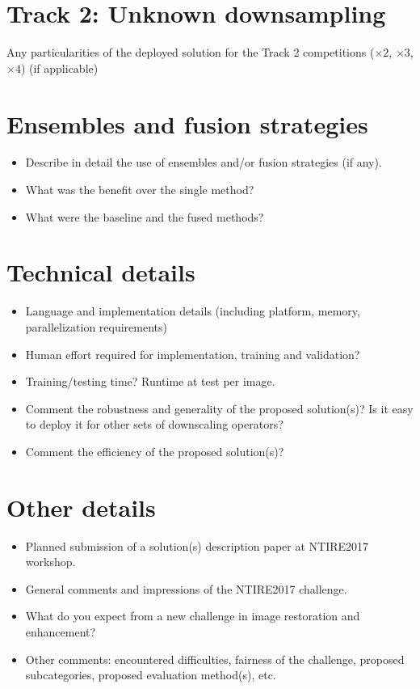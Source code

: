 \documentclass{article}
\begin{document}
\section{Track 2: Unknown downsampling}
Any particularities of the deployed solution for the Track 2 competitions ($\times2$, $\times3$, $\times 4$) (if applicable)

\section{Ensembles and fusion strategies}
\begin{itemize}
\item Describe in detail the use of ensembles and/or fusion strategies (if any).
\item What was the benefit over the single method? 
\item What were the baseline and the fused methods?
\end{itemize}

\section{Technical details}
\begin{itemize}
\item Language and implementation details (including platform, memory, parallelization requirements)
\item Human effort required for implementation, training and validation?
\item Training/testing time? Runtime at test per image.
\item Comment the robustness and generality of the proposed solution(s)? Is it easy to deploy it for other sets of downscaling operators? 
\item Comment the efficiency of the proposed solution(s)?
\end{itemize}

\section{Other details}
\begin{itemize}
\item Planned submission of a solution(s) description paper at NTIRE2017 workshop.
\item General comments and impressions of the NTIRE2017 challenge. 
\item What do you expect from a new challenge in image restoration and enhancement?
\item Other comments: encountered difficulties, fairness of the challenge, proposed subcategories, proposed evaluation method(s), etc.
\end{itemize}
\end{document}

